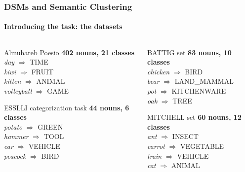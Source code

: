 \documentclass[t]{beamer} %
\begin{document}
\begin{frame}
  \frametitle{DSMs and Semantic Clustering}
  \framesubtitle{Introducing the task: the datasets}

  \ungap[1.5]
  \begin{columns}
    \begin{column}{0.5 \textwidth}
      \begin{exampleblock}{Almuhareb Poesio}
        \textbf{402 nouns, 21 classes} \\
        \textit{day} $\Longrightarrow$ \textsc{TIME}   \\
        \textit{kiwi} $\Longrightarrow$ \textsc{FRUIT}  \\
        \textit{kitten} $\Longrightarrow$ \textsc{ANIMAL} \\
        \textit{volleyball} $\Longrightarrow$ \textsc{GAME}
      \end{exampleblock}
      \begin{exampleblock}{ESSLLI categorization task}
        \textbf{44 nouns, 6 classes} \\
        \textit{potato} $\Longrightarrow$ \textsc{GREEN}  \\
        \textit{hammer} $\Longrightarrow$ \textsc{TOOL}  \\
        \textit{car} $\Longrightarrow$ \textsc{VEHICLE} \\
        \textit{peacock} $\Longrightarrow$ \textsc{BIRD}     
      \end{exampleblock}
    \end{column}
    \begin{column}{0.5 \textwidth}
      \begin{exampleblock}{BATTIG set}
        \textbf{83 nouns, 10 classes} \\
        \textit{chicken} $\Longrightarrow$ \textsc{BIRD}   \\
        \textit{bear} $\Longrightarrow$ \textsc{LAND\_MAMMAL}  \\
        \textit{pot} $\Longrightarrow$ \textsc{KITCHENWARE} \\
        \textit{oak} $\Longrightarrow$ \textsc{TREE} 
      \end{exampleblock}
      \begin{exampleblock}{MITCHELL set}
        \textbf{60 nouns, 12 classes} \\
        \textit{ant} $\Longrightarrow$ \textsc{INSECT}   \\
        \textit{carrot} $\Longrightarrow$ \textsc{VEGETABLE}  \\
        \textit{train} $\Longrightarrow$ \textsc{VEHICLE} \\
        \textit{cat} $\Longrightarrow$ \textsc{ANIMAL}
      \end{exampleblock}
    \end{column}
  \end{columns}
\end{frame}
\end{document}
